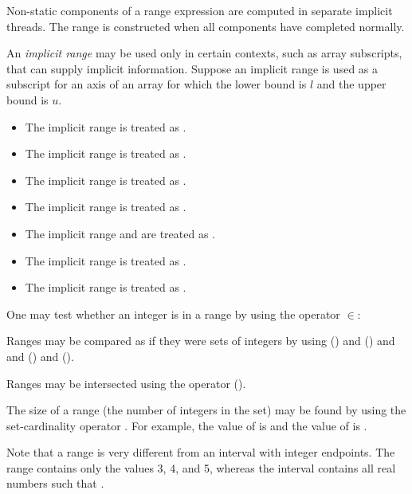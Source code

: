 Non-static components of a range expression are computed in separate
implicit threads.  The range is constructed when all components have
completed normally.

An \emph{implicit range} may be used only in certain contexts, such as array subscripts,
that can supply implicit information.  Suppose an implicit range is used as a subscript
for an axis of an array for which the lower bound is $l$ and the upper bound is $u$.
\begin{itemize}
\item The implicit range \EXP{\COLONOP} is treated as .
\item The implicit range  is
  treated as .
\item The implicit range  is treated as .
\item The implicit range  is treated as
.
\item The implicit range  and  are treated as .
\item The implicit range  is treated as
.
\item The implicit range  is treated as .
\end{itemize}

One may test whether an integer is in a range by using the operator $\in$:


Ranges may be compared as if they were sets of integers by using
\EXP{\subset} () and \EXP{\subseteq} ()
and \EXP{=} and \EXP{\supseteq} () and \EXP{\supset} ().

Ranges may be intersected using the operator \EXP{\cap} ().

The size of a range (the number of integers in the set)
may be found by using the set-cardinality operator
\EXP{\left|\ldots\right|}.  For example, the value of \EXP{\left|3\COLONOP{}7\right|} is 
and the value of \EXP{\left|1\COLONOP{}100\COLONOP{}2\right|} is .

Note that a range is very different from an interval with integer endpoints.
The range  contains only the values 3, 4, and 5,
whereas the interval \EXP{[3,5]} contains all real numbers  such that .
